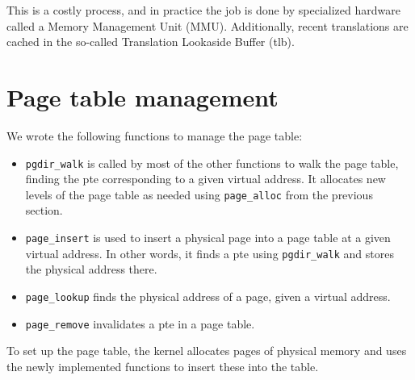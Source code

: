 \documentclass{report}
\begin{document}
This is a costly process, and in practice the job is done by specialized
hardware called a Memory Management Unit (MMU). Additionally, recent
translations are cached in the so-called Translation Lookaside Buffer
(\gls{tlb}).


\section{Page table management}
\label{sec:pagetables}
We wrote the following functions to manage the page table:
\begin{itemize}
\item \texttt{pgdir\_walk} is called by most of the other functions to walk the
page table, finding the \gls{pte} corresponding to a given virtual address. It
allocates new levels of the page table as needed using \texttt{page\_alloc}
from the previous section.
\item \texttt{page\_insert} is used to insert a physical page into a page
table at a given virtual address. In other words, it finds a \gls{pte} using
\texttt{pgdir\_walk} and stores the physical address there.
\item \texttt{page\_lookup} finds the physical address of a page, given a
virtual address.
\item \texttt{page\_remove} invalidates a \gls{pte} in a page table.
\end{itemize}
To set up the page table, the kernel allocates pages of physical memory and
uses the newly implemented functions to insert these into the table.
\end{document}
